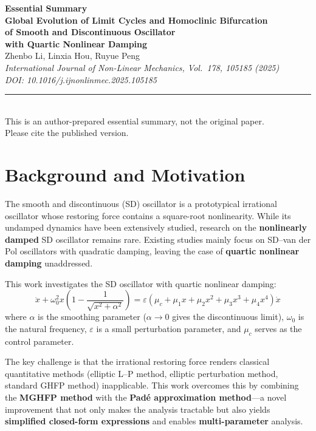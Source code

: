 \documentclass[11pt,a4paper]{article}
\begin{document}
\begin{center}
{\LARGE\bfseries\color{primary}Essential Summary}\\[12pt]
{\large\bfseries Global Evolution of Limit Cycles and Homoclinic Bifurcation\\of Smooth and Discontinuous Oscillator\\with Quartic Nonlinear Damping}\\[8pt]
{\normalsize Zhenbo Li, Linxia Hou, Ruyue Peng}\\[4pt]
{\small\itshape International Journal of Non-Linear Mechanics, Vol.\ 178, 105185 (2025)\\DOI: 10.1016/j.ijnonlinmec.2025.105185}\\[6pt]
{\small\rule{0.7\textwidth}{0.5pt}}\\[4pt]
{\small\color{accent}This is an author-prepared essential summary, not the original paper.\\Please cite the published version.}
\end{center}

\vspace{0.5em}

\section{Background and Motivation}

The smooth and discontinuous (SD) oscillator is a prototypical irrational oscillator whose restoring force contains a square-root nonlinearity. While its undamped dynamics have been extensively studied, research on the \textbf{nonlinearly damped} SD oscillator remains rare. Existing studies mainly focus on SD--van der Pol oscillators with quadratic damping, leaving the case of \textbf{quartic nonlinear damping} unaddressed.

This work investigates the SD oscillator with quartic nonlinear damping:
\begin{equation}
\ddot{x} + \omega_0^2 x\left(1 - \frac{1}{\sqrt{x^2+\alpha^2}}\right) = \varepsilon(\mu_c + \mu_1 x + \mu_2 x^2 + \mu_3 x^3 + \mu_4 x^4)\dot{x}
\label{eq:model}
\end{equation}
where $\alpha$ is the smoothing parameter ($\alpha \to 0$ gives the discontinuous limit), $\omega_0$ is the natural frequency, $\varepsilon$ is a small perturbation parameter, and $\mu_c$ serves as the control parameter.

The key challenge is that the irrational restoring force renders classical quantitative methods (elliptic L--P method, elliptic perturbation method, standard GHFP method) inapplicable. This work overcomes this by combining the \textbf{MGHFP method} with the \textbf{Pad\'e approximation method}---a novel improvement that not only makes the analysis tractable but also yields \textbf{simplified closed-form expressions} and enables \textbf{multi-parameter} analysis.
\end{document}
